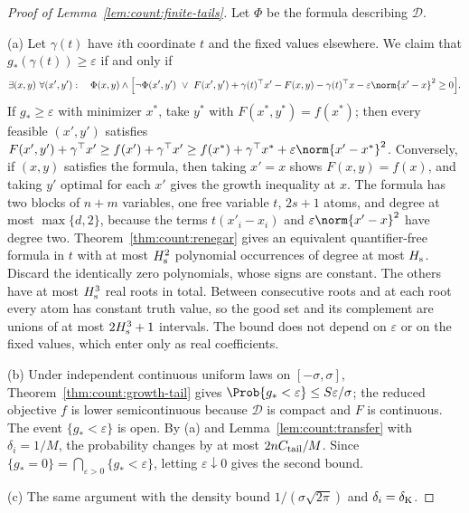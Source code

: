 \begin{proof}[Proof of Lemma~\ref{lem:count:finite-tails}]
Let $\Phi$ be the formula describing $\mathcal D$.

(a) Let $\gamma(t)$ have $i$th coordinate $t$ and the fixed values elsewhere.
We claim that $g_*(\gamma(t))\ge\varepsilon$ if and only if
\[
 \exists(x,y)\ \forall(x',y'):\quad
 \Phi(x,y)\wedge\Bigl[\neg\Phi(x',y')\ \vee\
 F(x',y')+\gamma(t)^\top x'-F(x,y)-\gamma(t)^\top x-\varepsilon\norm{x'-x}^2\ge0\Bigr].
\]
If $g_*\ge\varepsilon$ with minimizer $x^*$, take $y^*$ with
$F(x^*,y^*)=f(x^*)$; then every feasible $(x',y')$ satisfies
$F(x',y')+\gamma^\top x'\ge f(x')+\gamma^\top x'\ge f(x^*)+\gamma^\top x^*+\varepsilon\norm{x'-x^*}^2$.
Conversely, if $(x,y)$ satisfies the formula, then taking $x'=x$ shows
$F(x,y)=f(x)$, and taking $y'$ optimal for each $x'$ gives the growth
inequality at $x$. The formula has two blocks of $n+m$ variables, one free
variable $t$, $2s+1$ atoms, and degree at most $\max\{d,2\}$, because the
terms $t(x'_i-x_i)$ and $\varepsilon\norm{x'-x}^2$ have degree two. Theorem~\ref{thm:count:renegar}
gives an equivalent quantifier-free formula in $t$ with at most $H_{\rm s}^2$
polynomial occurrences of degree at most $H_{\rm s}$. Discard the identically
zero polynomials, whose signs are constant. The others have at most
$H_{\rm s}^3$ real roots in total. Between consecutive roots and at each root
every atom has constant truth value, so the good set and its complement are
unions of at most $2H_{\rm s}^3+1$ intervals. The bound does not depend on
$\varepsilon$ or on the fixed values, which enter only as real coefficients.

(b) Under independent continuous uniform laws on $[-\sigma,\sigma]$,
Theorem~\ref{thm:count:growth-tail} gives
$\Prob\{g_*<\varepsilon\}\le S\varepsilon/\sigma$; the reduced objective $f$
is lower semicontinuous because $\mathcal D$ is compact and $F$ is
continuous. The event $\{g_*<\varepsilon\}$ is open. By (a) and
Lemma~\ref{lem:count:transfer} with $\delta_i=1/M$, the probability changes
by at most $2nC_{\rm tail}/M$. Since $\{g_*=0\}=\bigcap_{\varepsilon>0}\{g_*<\varepsilon\}$,
letting $\varepsilon\downarrow0$ gives the second bound.

(c) The same argument with the density bound $1/(\sigma\sqrt{2\pi})$ and
$\delta_i=\delta_{\rm K}$.


\end{proof}

